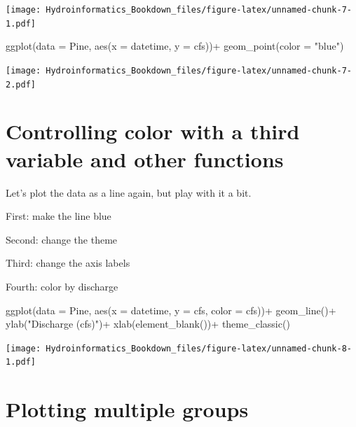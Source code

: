 \documentclass[
]{book}
\newenvironment{Shaded}{\begin{snugshade}}{\end{snugshade}}
\newcommand{\AttributeTok}[1]{\textcolor[rgb]{0.77,0.63,0.00}{#1}}
\newcommand{\FunctionTok}[1]{\textcolor[rgb]{0.00,0.00,0.00}{#1}}
\newcommand{\NormalTok}[1]{#1}
\newcommand{\SpecialCharTok}[1]{\textcolor[rgb]{0.00,0.00,0.00}{#1}}
\newcommand{\StringTok}[1]{\textcolor[rgb]{0.31,0.60,0.02}{#1}}
\begin{document}
\texttt{[image: Hydroinformatics\_Bookdown\_files/figure-latex/unnamed-chunk-7-1.pdf]}

\begin{Shaded}
\begin{Highlighting}[]
\FunctionTok{ggplot}\NormalTok{(}\AttributeTok{data =}\NormalTok{ Pine, }\FunctionTok{aes}\NormalTok{(}\AttributeTok{x =}\NormalTok{ datetime, }\AttributeTok{y =}\NormalTok{ cfs))}\SpecialCharTok{+}
  \FunctionTok{geom\_point}\NormalTok{(}\AttributeTok{color =} \StringTok{"blue"}\NormalTok{)}
\end{Highlighting}
\end{Shaded}

\texttt{[image: Hydroinformatics\_Bookdown\_files/figure-latex/unnamed-chunk-7-2.pdf]}

\hypertarget{controlling-color-with-a-third-variable-and-other-functions}{%
\section{Controlling color with a third variable and other functions}\label{controlling-color-with-a-third-variable-and-other-functions}}

Let's plot the data as a line again, but play with it a bit.

First: make the line blue

Second: change the theme

Third: change the axis labels

Fourth: color by discharge

\begin{Shaded}
\begin{Highlighting}[]
\FunctionTok{ggplot}\NormalTok{(}\AttributeTok{data =}\NormalTok{ Pine, }\FunctionTok{aes}\NormalTok{(}\AttributeTok{x =}\NormalTok{ datetime, }\AttributeTok{y =}\NormalTok{ cfs, }\AttributeTok{color =}\NormalTok{ cfs))}\SpecialCharTok{+}
  \FunctionTok{geom\_line}\NormalTok{()}\SpecialCharTok{+}
  \FunctionTok{ylab}\NormalTok{(}\StringTok{"Discharge (cfs)"}\NormalTok{)}\SpecialCharTok{+}
  \FunctionTok{xlab}\NormalTok{(}\FunctionTok{element\_blank}\NormalTok{())}\SpecialCharTok{+}
  \FunctionTok{theme\_classic}\NormalTok{()}
\end{Highlighting}
\end{Shaded}

\texttt{[image: Hydroinformatics\_Bookdown\_files/figure-latex/unnamed-chunk-8-1.pdf]}

\hypertarget{plotting-multiple-groups}{%
\section{Plotting multiple groups}\label{plotting-multiple-groups}}
\end{document}
